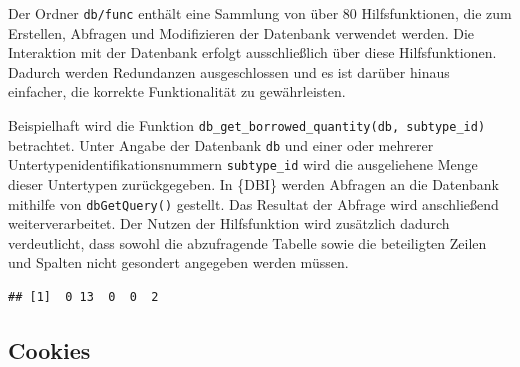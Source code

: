 \documentclass[
]{article}
\newenvironment{Shaded}{\begin{snugshade}}{\end{snugshade}}
\newcommand{\AttributeTok}[1]{\textcolor[rgb]{0.77,0.63,0.00}{#1}}
\newcommand{\CommentTok}[1]{\textcolor[rgb]{0.56,0.35,0.01}{\textit{#1}}}
\newcommand{\ControlFlowTok}[1]{\textcolor[rgb]{0.13,0.29,0.53}{\textbf{#1}}}
\newcommand{\DecValTok}[1]{\textcolor[rgb]{0.00,0.00,0.81}{#1}}
\newcommand{\FunctionTok}[1]{\textcolor[rgb]{0.00,0.00,0.00}{#1}}
\newcommand{\NormalTok}[1]{#1}
\newcommand{\OtherTok}[1]{\textcolor[rgb]{0.56,0.35,0.01}{#1}}
\newcommand{\SpecialCharTok}[1]{\textcolor[rgb]{0.00,0.00,0.00}{#1}}
\newcommand{\StringTok}[1]{\textcolor[rgb]{0.31,0.60,0.02}{#1}}
\begin{document}
Der Ordner \texttt{db/func} enthält eine Sammlung von über 80 Hilfsfunktionen, die zum Erstellen, Abfragen und Modifizieren der Datenbank verwendet werden. Die Interaktion mit der Datenbank erfolgt ausschließlich über diese Hilfsfunktionen. Dadurch werden Redundanzen ausgeschlossen und es ist darüber hinaus einfacher, die korrekte Funktionalität zu gewährleisten.

Beispielhaft wird die Funktion \texttt{db\_get\_borrowed\_quantity(db,\ subtype\_id)} betrachtet. Unter Angabe der Datenbank \texttt{db} und einer oder mehrerer Untertypenidentifikationsnummern \texttt{subtype\_id} wird die ausgeliehene Menge dieser Untertypen zurückgegeben. In \{DBI\} werden Abfragen an die Datenbank mithilfe von \texttt{dbGetQuery()} gestellt. Das Resultat der Abfrage wird anschließend weiterverarbeitet. Der Nutzen der Hilfsfunktion wird zusätzlich dadurch verdeutlicht, dass sowohl die abzufragende Tabelle sowie die beteiligten Zeilen und Spalten nicht gesondert angegeben werden müssen.

\begin{Shaded}
\end{Shaded}

\begin{verbatim}
## [1]  0 13  0  0  2
\end{verbatim}

\hypertarget{cookies}{%
\subsection{Cookies}\label{cookies}}
\end{document}
